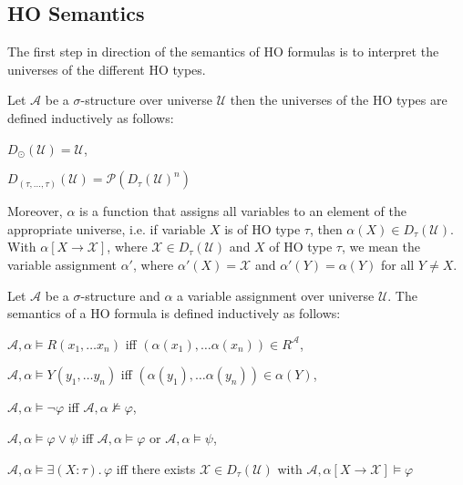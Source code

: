 \subsection{HO Semantics}\label{subsec:hoSemantics}

The first step in direction of the semantics of HO formulas is to interpret the universes of the different HO types.

\begin{definition}
    Let $\mathcal{A}$ be a $\sigma$-structure over universe $\mathcal{U}$ then the universes of the
    HO types are defined inductively as follows:
    \begin{compactitem}
        \item $D_\odot(\mathcal{U}) = \mathcal{U}$,
        \item $D_{(\tau, \dots, \tau)}(\mathcal{U}) = \mathcal{P}(D_{\tau}(\mathcal{U})^n)$
    \end{compactitem}
\end{definition}

Moreover, $\alpha$ is a function that assigns all variables to an element of the appropriate universe, i.e. if
variable $X$ is of HO type $\tau$, then $\alpha(X) \in D_{\tau}(\mathcal{U})$. With $\alpha[X \rightarrow \mathcal{X}]$,
where $\mathcal{X} \in D_\tau(\mathcal{U})$ and $X$ of HO type $\tau$, we mean the variable assignment $\alpha'$,
where $\alpha'(X) = \mathcal{X}$ and $\alpha'(Y) = \alpha(Y)$ for all $Y \neq X$.

\begin{definition}
    Let $\mathcal{A}$ be a $\sigma$-structure and $\alpha$ a variable assignment over universe $\mathcal{U}$. The
    semantics of a HO formula is defined inductively as follows:
    \begin{compactitem}
        \item $\mathcal{A}, \alpha \models R(x_1, \dots x_n)$ iff $(\alpha(x_1), \dots
        \alpha(x_n)) \in R^{\mathcal{A}}$,
        \item $\mathcal{A}, \alpha \models Y(y_1, \dots y_n)$ iff $(\alpha(y_1), \dots
        \alpha(y_n)) \in \alpha(Y)$,
        \item $\mathcal{A}, \alpha \models \neg\varphi$ iff $\mathcal{A}, \alpha\not\models\varphi$,
        \item $\mathcal{A}, \alpha \models \varphi \vee \psi$ iff $\mathcal{A}, \alpha\models\varphi$ or $\mathcal{A},
        \alpha\models\psi$,
        \item $\mathcal{A}, \alpha \models \exists (X\colon\tau).\,\varphi$ iff there exists $\mathcal{X} \in D_{\tau}
        (\mathcal{U})$ with $\mathcal{A}, \alpha[X \rightarrow \mathcal{X}] \models \varphi$
        \end{compactitem}
\end{definition}

